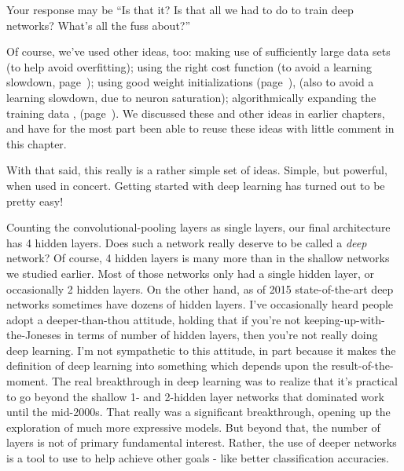 Your response may be ``Is that it? Is that all we had to do to train deep networks? What's all the fuss about?''

Of course, we've used other ideas, too: making use of sufficiently large data sets (to help avoid overfitting); using the right cost function (to avoid a learning slowdown, page~\pageref{sec:ImprovingTheWayNeuralNetworksLearn}); using good weight initializations (page~\pageref{sec:Weightinitialization}), (also to avoid a learning slowdown, due to neuron saturation); algorithmically expanding the training data , (page~\pageref{sec:Othertechniquesforregularization}). We discussed these and other ideas in earlier chapters, and have for the most part been able to reuse these ideas with little comment in this chapter.

With that said, this really is a rather simple set of ideas. Simple, but powerful, when used in concert. Getting started with deep learning has turned out to be pretty easy!

 Counting the convolutional-pooling layers as single layers, our final architecture has 4 hidden layers. Does such a network really deserve to be called a \textit{deep} network? Of course, 4 hidden layers is many more than in the shallow networks we studied earlier. Most of those networks only had a single hidden layer, or occasionally 2 hidden layers. On the other hand, as of 2015 state-of-the-art deep networks sometimes have dozens of hidden layers. I've occasionally heard people adopt a deeper-than-thou attitude, holding that if you're not keeping-up-with-the-Joneses in terms of number of hidden layers, then you're not really doing deep learning. I'm not sympathetic to this attitude, in part because it makes the definition of deep learning into something which depends upon the result-of-the-moment. The real breakthrough in deep learning was to realize that it's practical to go beyond the shallow 1- and 2-hidden layer networks that dominated work until the mid-2000s. That really was a significant breakthrough, opening up the exploration of much more expressive models. But beyond that, the number of layers is not of primary fundamental interest. Rather, the use of deeper networks is a tool to use to help achieve other goals - like better classification accuracies.

